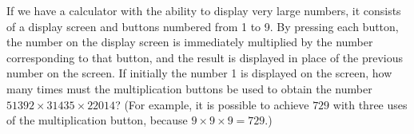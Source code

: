 \documentclass{article}
\begin{document}
If we have a calculator with the ability to display very large numbers, it consists of a display screen and buttons numbered from 1 to 9. By pressing each button, the number on the display screen is immediately multiplied by the number corresponding to that button, and the result is displayed in place of the previous number on the screen. If initially the number 1 is displayed on the screen, how many times must the multiplication buttons be used to obtain the number $51392 \times 31435 \times 22014$? (For example, it is possible to achieve $729$ with three uses of the multiplication button, because $9 \times 9 \times 9 = 729$.)
\end{document}
